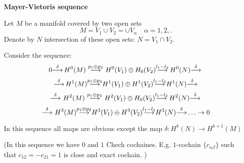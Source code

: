  \baselineskip=14pt
\def\vare {\varepsilon}
\def\A {{\bf A}}
\def\t {\tilde}
\def\a {\alpha}
\def\K {{\bf K}}
\def\N {{\bf N}}
\def\V {{\cal V}}
\def\s {{\sigma}}
\def\S {{\Sigma}}
\def\s {{\sigma}}
\def\p{\partial}
\def\vare{{\varepsilon}}
\def\Q {{\bf Q}}
\def\D {{\cal D}}
\def\G {{\Gamma}}
\def\C {{\bf C}}
\def\M {{\cal M}}
\def\Z {{\bf Z}}
\def\U  {{\cal U}}
\def\H {{\cal H}}
\def\R  {{\bf R}}
\def\E  {{\bf E}}
\def\l {\lambda}
\def\degree {{\bf {\rm degree}\,\,}}
\def \finish {${\,\,\vrule height1mm depth2mm width 8pt}$}
\def \m {\medskip}
\def\p {\partial}
\def\r {{\bf r}}
\def\v {{\bf v}}
\def\n {{\bf n}}
\def\t {{\bf t}}
\def\b {{\bf b}}
\def\e{{\bf e}}
\def\ac {{\bf a}}
\def \X   {{\bf X}}
\def \Y   {{\bf Y}}
\def \x   {{\bf x}}
\def \y   {{\bf y}}
\def\f {{\bf f}}
\def\pt {{\bf pt}}
\def\w {\omega}
\centerline  {\bf  Mayer-Vietoris sequence}






Let $M$ be a manifold covered by two open sets
         $$
 M= V_1\cup V_2=\cup V_\a \quad \alpha=1,2,.
     $$
Denote by $N$ intersection of these open sets: $N=V_1\cap V_2$.

  Consider the sequence:
          $$
0{\buildrel \delta\over \longrightarrow}\,H^0(M)\,\,{\buildrel p_1\oplus p_2\over \longrightarrow}\,\, 
H^0(V_1)\oplus H_0(V_2){\buildrel l_1-l_2\over \longrightarrow}\, 
H^0(N) {\buildrel \delta\over \longrightarrow}\,
           $$
           $$
           {\buildrel \delta\over \longrightarrow}\,
            H^1(M)
 {\buildrel p_1\oplus p_2\over \longrightarrow} H^1(V_1)\oplus H^1(V_2)
 {\buildrel l_1-l_2\over \longrightarrow} H^1(N){\buildrel \delta\over \longrightarrow}
          $$
          $$
          {\buildrel \delta\over \longrightarrow}\
 H^2(M)\,\,{\buildrel p_1\oplus p_2\over \longrightarrow}\,\,
H^2(V_1)\oplus H_0(V_2){\buildrel l_1-l_2\over \longrightarrow}\,
H^2(N) {\buildrel \delta\over \longrightarrow}\, 
            $$
            $$
            {\buildrel \delta\over \longrightarrow}\
            H^3(M)
 {\buildrel p_1\oplus p_2\over \longrightarrow} H^3(V_1)\oplus H^3(V_2)
 {\buildrel l_1-l_2\over \longrightarrow} H^3(N){\buildrel \delta\over \longrightarrow}\ldots\to 0
          $$




In this sequence all maps are obvious except the map $\delta\colon H^k(N)\to H^{k+1}(M)$


(In this sequence we have $0$ and $1$ Chech cochaines. E.g. $1$-cochain $\{c_{\a\beta}\}$
such that $c_{12}=-c_{21}=1$ is close and exact cochain. )

